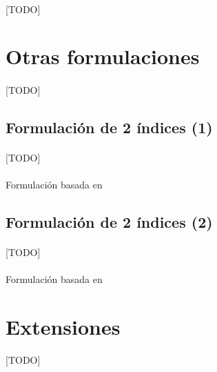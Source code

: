\documentclass{subfiles}
\begin{document}
      \paragraph{}
      [TODO]

    \section{Otras formulaciones}
    \label{sec:formulation_other_formulations}

      \paragraph{}
      [TODO]

      \subsection{Formulación de 2 índices (1)}
      \label{sec:formulation_two_index_1_formulation}

        \paragraph{}
        [TODO]

        \paragraph{}
        Formulación basada en \cite{ropke2007models}

        \subsection{Formulación de 2 índices (2)}
      \label{sec:formulation_two_index_2_formulation}

        \paragraph{}
        [TODO]

        \paragraph{}
        Formulación basada en \cite{ropke2007models}

    \section{Extensiones}
    \label{sec:formulation_extensions}
      [TODO]
\end{document}
